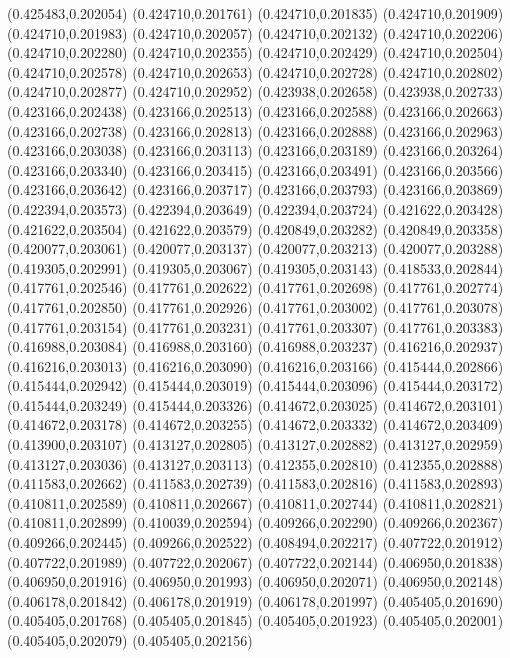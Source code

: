 (0.425483,0.202054)
(0.424710,0.201761)
(0.424710,0.201835)
(0.424710,0.201909)
(0.424710,0.201983)
(0.424710,0.202057)
(0.424710,0.202132)
(0.424710,0.202206)
(0.424710,0.202280)
(0.424710,0.202355)
(0.424710,0.202429)
(0.424710,0.202504)
(0.424710,0.202578)
(0.424710,0.202653)
(0.424710,0.202728)
(0.424710,0.202802)
(0.424710,0.202877)
(0.424710,0.202952)
(0.423938,0.202658)
(0.423938,0.202733)
(0.423166,0.202438)
(0.423166,0.202513)
(0.423166,0.202588)
(0.423166,0.202663)
(0.423166,0.202738)
(0.423166,0.202813)
(0.423166,0.202888)
(0.423166,0.202963)
(0.423166,0.203038)
(0.423166,0.203113)
(0.423166,0.203189)
(0.423166,0.203264)
(0.423166,0.203340)
(0.423166,0.203415)
(0.423166,0.203491)
(0.423166,0.203566)
(0.423166,0.203642)
(0.423166,0.203717)
(0.423166,0.203793)
(0.423166,0.203869)
(0.422394,0.203573)
(0.422394,0.203649)
(0.422394,0.203724)
(0.421622,0.203428)
(0.421622,0.203504)
(0.421622,0.203579)
(0.420849,0.203282)
(0.420849,0.203358)
(0.420077,0.203061)
(0.420077,0.203137)
(0.420077,0.203213)
(0.420077,0.203288)
(0.419305,0.202991)
(0.419305,0.203067)
(0.419305,0.203143)
(0.418533,0.202844)
(0.417761,0.202546)
(0.417761,0.202622)
(0.417761,0.202698)
(0.417761,0.202774)
(0.417761,0.202850)
(0.417761,0.202926)
(0.417761,0.203002)
(0.417761,0.203078)
(0.417761,0.203154)
(0.417761,0.203231)
(0.417761,0.203307)
(0.417761,0.203383)
(0.416988,0.203084)
(0.416988,0.203160)
(0.416988,0.203237)
(0.416216,0.202937)
(0.416216,0.203013)
(0.416216,0.203090)
(0.416216,0.203166)
(0.415444,0.202866)
(0.415444,0.202942)
(0.415444,0.203019)
(0.415444,0.203096)
(0.415444,0.203172)
(0.415444,0.203249)
(0.415444,0.203326)
(0.414672,0.203025)
(0.414672,0.203101)
(0.414672,0.203178)
(0.414672,0.203255)
(0.414672,0.203332)
(0.414672,0.203409)
(0.413900,0.203107)
(0.413127,0.202805)
(0.413127,0.202882)
(0.413127,0.202959)
(0.413127,0.203036)
(0.413127,0.203113)
(0.412355,0.202810)
(0.412355,0.202888)
(0.411583,0.202662)
(0.411583,0.202739)
(0.411583,0.202816)
(0.411583,0.202893)
(0.410811,0.202589)
(0.410811,0.202667)
(0.410811,0.202744)
(0.410811,0.202821)
(0.410811,0.202899)
(0.410039,0.202594)
(0.409266,0.202290)
(0.409266,0.202367)
(0.409266,0.202445)
(0.409266,0.202522)
(0.408494,0.202217)
(0.407722,0.201912)
(0.407722,0.201989)
(0.407722,0.202067)
(0.407722,0.202144)
(0.406950,0.201838)
(0.406950,0.201916)
(0.406950,0.201993)
(0.406950,0.202071)
(0.406950,0.202148)
(0.406178,0.201842)
(0.406178,0.201919)
(0.406178,0.201997)
(0.405405,0.201690)
(0.405405,0.201768)
(0.405405,0.201845)
(0.405405,0.201923)
(0.405405,0.202001)
(0.405405,0.202079)
(0.405405,0.202156)
